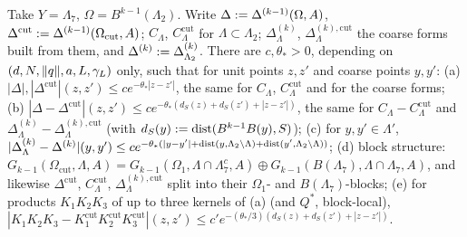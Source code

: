 \begin{lemma}\label{lem:a06f:F2}
Take $Y=\Lambda_7$, $\Omega=B^{k-1}(\Lambda_2)$. Write $\Delta:=\Delta^{(k-1)}(\Omega,A)$, $\Delta^{\mathrm{cut}}:=\Delta^{(k-1)}(\Omega_{\mathrm{cut}},A)$; $C_\Lambda$, $C^{\mathrm{cut}}_\Lambda$ for $\Lambda\subset\Lambda_2$; $\Delta^{(k)}_\Lambda$, $\Delta^{(k),\mathrm{cut}}_\Lambda$ the coarse forms built from them, and $\Delta^{(k)}:=\Delta^{(k)}_{\Lambda_2}$. There are $c,\theta_*>0$, depending on $(d,N,\lVert q\rVert,a,L,\gamma_L)$ only, such that for unit points $z,z'$ and coarse points $y,y'$: \textup{(a)} $|\Delta|,|\Delta^{\mathrm{cut}}|(z,z')\le ce^{-\theta_*|z-z'|}$, the same for $C_\Lambda$, $C^{\mathrm{cut}}_\Lambda$ and for the coarse forms; \textup{(b)} $|\Delta-\Delta^{\mathrm{cut}}|(z,z')\le ce^{-\theta_*(d_S(z)+d_S(z')+|z-z'|)}$, the same for $C_\Lambda-C^{\mathrm{cut}}_\Lambda$ and $\Delta^{(k)}_\Lambda-\Delta^{(k),\mathrm{cut}}_\Lambda$ (with $d_S(y):=\operatorname{dist}(B^{k-1}B(y),S)$); \textup{(c)} for $y,y'\in\Lambda'$, $|\Delta^{(k)}_\Lambda-\Delta^{(k)}|(y,y')\le ce^{-\theta_*(|y-y'|+\operatorname{dist}(y,\Lambda_2\setminus\Lambda)+\operatorname{dist}(y',\Lambda_2\setminus\Lambda))}$; \textup{(d)} block structure: $G_{k-1}(\Omega_{\mathrm{cut}},\Lambda,A)=G_{k-1}(\Omega_1,\Lambda\cap\Lambda_7^c,A)\oplus G_{k-1}(B(\Lambda_7),\Lambda\cap\Lambda_7,A)$, and likewise $\Delta^{\mathrm{cut}}$, $C^{\mathrm{cut}}_\Lambda$, $\Delta^{(k),\mathrm{cut}}_\Lambda$ split into their $\Omega_1$- and $B(\Lambda_7)$-blocks; \textup{(e)} for products $K_1K_2K_3$ of up to three kernels of \textup{(a)} (and $Q^*$, block-local), $|K_1K_2K_3-K^{\mathrm{cut}}_1K^{\mathrm{cut}}_2K^{\mathrm{cut}}_3|(z,z')\le c'e^{-(\theta_*/3)(d_S(z)+d_S(z')+|z-z'|)}$.
\end{lemma}

